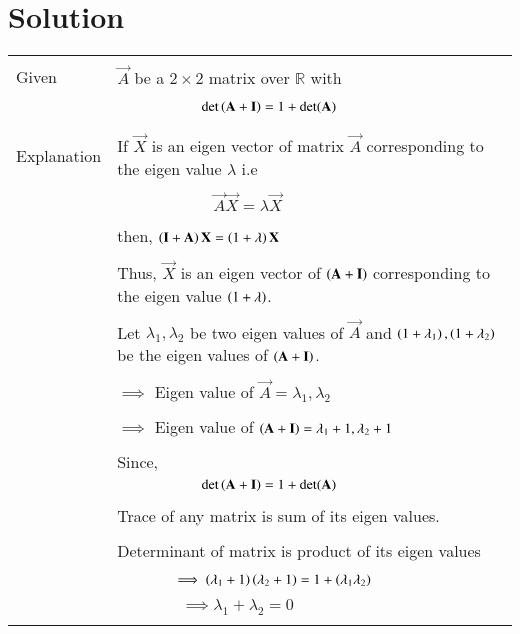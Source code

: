 \documentclass[journal,12pt]{IEEEtran}
\begin{document}
\section{\textbf{Solution}}
\renewcommand{\thetable}{1}
\begin{longtable}{|p{5cm}|p{13cm}|}
\hline
    \multirow{3}{*}{Given} 
    &\\
     & $\vec{A}$ be a $2\times2$ matrix over $\mathbb{R}$ with\\
     &\\
      &$\qquad\qquad \qquad \det\left(\mathbf{A}+\mathbf{I}\right)=1+\det(\mathbf{A})$\\
      &\\
     \hline
     \multirow{3}{*}{Explanation} &\\
     & If $\vec{X}$ is an eigen vector of matrix $\vec{A}$
     corresponding to the eigen value $\lambda$ i.e \\
     &\\
     & $\qquad\qquad\qquad\vec{A}\vec{X}=\lambda\vec{X}$\\
     &\\
     & then, $\left(\mathbf{I}+\mathbf{A}\right)\mathbf{X}=\left(1+\lambda\right)\mathbf{X}$\\
     &\\
     &Thus, $\vec{X}$ is an eigen vector of $\left(\mathbf{A}+\mathbf{I}\right)$ corresponding to the eigen value $\left(1+\lambda\right)$.\\
     
     &\\
     
     & Let $\lambda_1,\lambda_2$ be two eigen values of $\vec{A}$ and $\left(1+\lambda_1\right),\left(1+\lambda_2\right)$ be the eigen values of $\left(\mathbf{A}+\mathbf{I}\right).$\\
    &\\
    & $\implies$ Eigen value of $\vec{A}=\lambda_1,\lambda_2$\\
    &\\
    &  $\implies$ Eigen value of $\left(\mathbf{A}+\mathbf{I}\right) = \lambda_1+1,\lambda_2+1$\\
    &\\
    & Since,\\
    \hline
    &$\qquad\qquad \qquad \det\left(\mathbf{A}+\mathbf{I}\right)=1+\det(\mathbf{A})$\\
    &\\
     & Trace of any matrix is sum of its eigen values. \\
    &\\
    & Determinant of matrix is product of its eigen values \\
    &\\
    & $\qquad\qquad\implies \left(\lambda_1+1\right)\left(\lambda_2+1\right)=1+\left(\lambda_1\lambda_2\right)$\\
    &\\
    &$\qquad\qquad\implies\boxed{ \lambda_1+\lambda_2 = 0}$\\
    &\\
   

\end{longtable}
\end{document}
